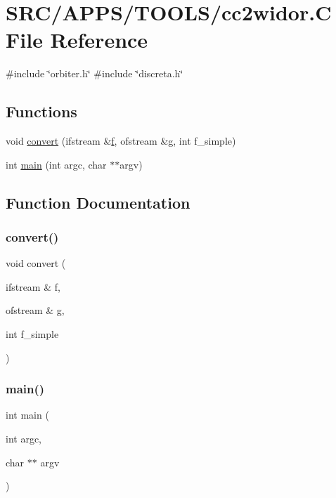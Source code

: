 \hypertarget{cc2widor_8_c}{}\section{S\+R\+C/\+A\+P\+P\+S/\+T\+O\+O\+L\+S/cc2widor.C File Reference}
\label{cc2widor_8_c}
{\ttfamily \#include \char`\"{}orbiter.\+h\char`\"{}}\newline
{\ttfamily \#include \char`\"{}discreta.\+h\char`\"{}}\newline
\subsection*{Functions}
\begin{DoxyCompactItemize}
\item 
void \mbox{\hyperlink{cc2widor_8_c_a4c1cdd34634be31b0a15025f1aeebf01}{convert}} (ifstream \&\mbox{\hyperlink{alphabet2_8_c_a362077c979b0bb65159c603270e40f70}{f}}, ofstream \&g, int f\+\_\+simple)
\item 
int \mbox{\hyperlink{cc2widor_8_c_a3c04138a5bfe5d72780bb7e82a18e627}{main}} (int argc, char $\ast$$\ast$argv)
\end{DoxyCompactItemize}


\subsection{Function Documentation}
\mbox{\label{cc2widor_8_c_a4c1cdd34634be31b0a15025f1aeebf01}} 
\subsubsection{\texorpdfstring{convert()}{convert()}}
{\footnotesize\ttfamily void convert (\begin{DoxyParamCaption}\item[{ifstream \&}]{f,  }\item[{ofstream \&}]{g,  }\item[{int}]{f\+\_\+simple }\end{DoxyParamCaption})}

\mbox{\label{cc2widor_8_c_a3c04138a5bfe5d72780bb7e82a18e627}} 
\subsubsection{\texorpdfstring{main()}{main()}}
{\footnotesize\ttfamily int main (\begin{DoxyParamCaption}\item[{int}]{argc,  }\item[{char $\ast$$\ast$}]{argv }\end{DoxyParamCaption})}

